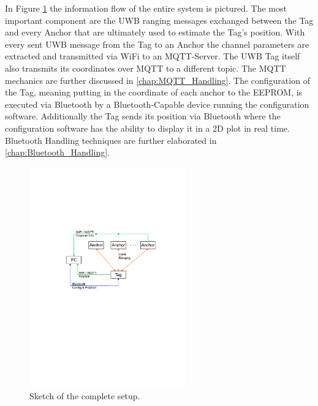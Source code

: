 In Figure \ref{fig:information_flow} the information flow of the entire system is pictured. 
The most important component are the UWB ranging messages exchanged between the Tag and every Anchor that are ultimately used to estimate the Tag's position. 
With every sent UWB message from the Tag to an Anchor the channel parameters are extracted and transmitted via WiFi to an MQTT-Server. 
The UWB Tag itself also transmits its coordinates over MQTT to a different topic. 
The MQTT mechanics are further discussed in \ref{chap:MQTT_Handling}. 
\vspace{4pt}
\newline
The configuration of the Tag, meaning putting in the coordinate of each anchor to the EEPROM, is executed via Bluetooth by a Bluetooth-Capable device running the configuration software. 
Additionally the Tag sends its position via Bluetooth where the configuration software has the ability to display it in a 2D plot in real time. 
Bluetooth Handling techniques are further elaborated in \ref{chap:Bluetooth_Handling}. 

\begin{figure}[!hbt]
	\centering
	\includegraphics[width=0.6\textwidth]{pictures/information_flow.pdf}
	\caption{Sketch of the complete setup.}
	\label{fig:information_flow}
\end{figure}
